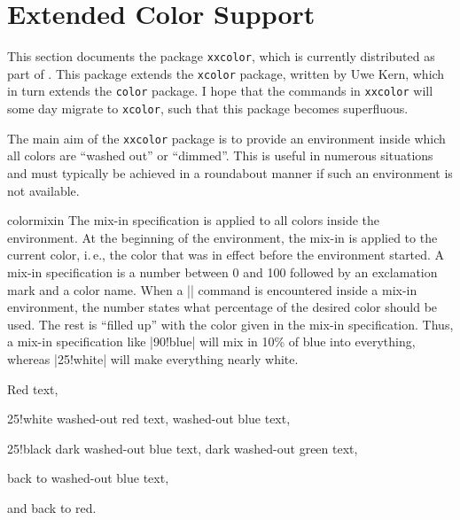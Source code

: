%
%
%


\section{Extended Color Support}

This section documents the package \texttt{xxcolor}, which is currently
distributed as part of \pgfname. This package extends the \texttt{xcolor}
package, written by Uwe Kern, which in turn extends the \texttt{color} package.
I hope that the commands in \texttt{xxcolor} will some day migrate to
\texttt{xcolor}, such that this package becomes superfluous.

The main aim of the \texttt{xxcolor} package is to provide an environment
inside which all colors are ``washed out'' or ``dimmed''. This is useful in
numerous situations and must typically be achieved in a roundabout manner if
such an environment is not available.

\begin{environment}{{colormixin}}
    The mix-in specification is applied to all colors inside the environment.
    At the beginning of the environment, the mix-in is applied to the current
    color, i.\,e., the color that was in effect before the environment started.
    A mix-in specification is a number between 0 and 100 followed by an
    exclamation mark and a color name. When a |\color| command is encountered
    inside a mix-in environment, the number states what percentage of the
    desired color should be used. The rest is ``filled up'' with the color
    given in the mix-in specification. Thus, a mix-in specification like
    |90!blue| will mix in 10\% of blue into everything, whereas |25!white| will
    make everything nearly white.
\begin{codeexample}[width=4cm,preamble={\usepackage{xxcolor}}]
\begin{minipage}{3.5cm}\raggedright
\color{red}Red text,%
\begin{colormixin}{25!white}
  washed-out red text,
  \color{blue} washed-out blue text,
  \begin{colormixin}{25!black}
    dark washed-out blue text,
    \color{green} dark washed-out green text,%
  \end{colormixin}
  back to washed-out blue text,%
\end{colormixin}
and back to red.
\end{minipage}%
\end{codeexample}
\end{environment}

